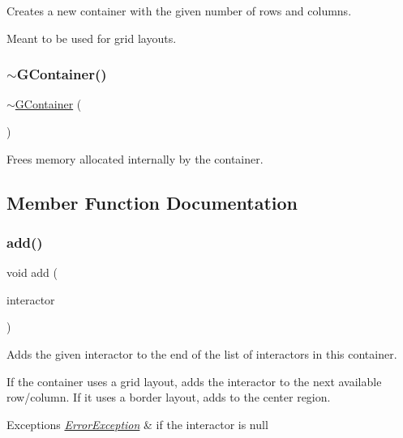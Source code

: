 Creates a new container with the given number of rows and columns. 

Meant to be used for grid layouts. \mbox{\label{classGContainer_a0a3b11ccad0281e55a509da7e1d94543}} 
\subsubsection{\texorpdfstring{$\sim$\+G\+Container()}{~GContainer()}}
{\footnotesize\ttfamily $\sim$\mbox{\hyperlink{classGContainer}{G\+Container}} (\begin{DoxyParamCaption}{ }\end{DoxyParamCaption})\hspace{0.3cm}{\ttfamily [virtual]}}



Frees memory allocated internally by the container. 



\subsection{Member Function Documentation}
\mbox{\label{classGContainer_a6f99b7c841256dbdc5acaafbbca4e685}} 
\subsubsection{\texorpdfstring{add()}{add()}\hspace{0.1cm}{\footnotesize\ttfamily [1/2]}}
{\footnotesize\ttfamily void add (\begin{DoxyParamCaption}\item[{\mbox{\hyperlink{classGInteractor}{G\+Interactor}} $\ast$}]{interactor }\end{DoxyParamCaption})\hspace{0.3cm}{\ttfamily [virtual]}}



Adds the given interactor to the end of the list of interactors in this container. 

If the container uses a grid layout, adds the interactor to the next available row/column. If it uses a border layout, adds to the center region. 
\begin{DoxyExceptions}{Exceptions}
{\em \mbox{\hyperlink{classErrorException}{Error\+Exception}}} & if the interactor is null \\
\hline
\end{DoxyExceptions}
\mbox{\label{classGContainer_a33b08fe5428ed634a658deab076099f7}} 
